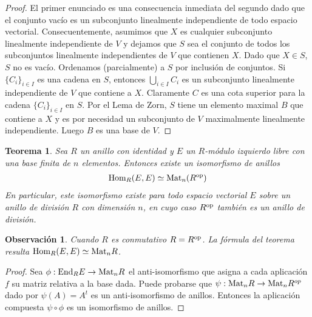\documentclass{report}
\newcommand{\Hom}{\textnormal{Hom}}
\newcommand{\End}{\textnormal{End}}
\newcommand{\Mat}{\textnormal{Mat}}
\newtheorem{theorem}{Teorema}
\newtheorem{remark}{Observación}
\begin{document}
  \begin{proof}
    El primer enunciado es una consecuencia inmediata del segundo dado que el conjunto vacío es un subconjunto linealmente independiente de todo espacio vectorial.
    Consecuentemente, asumimos que \(X\) es cualquier subconjunto linealmente independiente de \(V\) y dejamos que \(S\) sea el conjunto de todos los subconjuntos linealmente independientes de \(V\) que contienen \(X\).
    Dado que \(X \in S\), \(S\) no es vacío.
    Ordenamos (parcialmente) a \(S\) por inclusión de conjuntos.
    Si \(\{C_i\}_{i \in I}\) es una cadena en \(S\), entonces \(\bigcup_{i \in I} C_i\) es un subconjunto linealmente independiente de \(V\) que contiene a \(X\).
    Claramente \(C\) es una cota superior para la cadena \(\{C_i\}_{i \in I}\) en \(S\).
    Por el Lema de Zorn, \(S\) tiene un elemento maximal \(B\) que contiene a \(X\) y es por necesidad un subconjunto de \(V\) maximalmente linealmente independiente.
    Luego \(B\) es una base de \(V\).
  \end{proof}

  \begin{theorem}\label{theorem:isomorphismBetweenMatrixAndHomomorphismRings}
    Sea \(R\) un anillo con identidad y \(E\) un \(R\)-módulo izquierdo libre con una base finita de \(n\) elementos.
    Entonces existe un isomorfismo de anillos
    \begin{align}
      \Hom_R(E, E)
      \simeq
      \Mat_n(R^{\textnormal{op}})
    \end{align}
    En particular, este isomorfismo existe para todo espacio vectorial \(E\) sobre un anillo de división \(R\) con dimensión \(n\), en cuyo caso \(R^{\textnormal{op}}\) también es un anillo de división.
  \end{theorem}
  \begin{remark}
    Cuando \(R\) es conmutativo \(R = R^{\textnormal{op}}\).
    La fórmula del teorema resulta \(\Hom_R(E, E) \simeq \Mat_n R\).
  \end{remark}
  \begin{proof}
    Sea \(\phi: \End_R E \rightarrow \Mat_n R\) el anti-isomorfismo que asigna a cada aplicación \(f\) su matriz relativa a la base dada.
    Puede probarse que \(\psi : \Mat_n R \rightarrow \Mat_n R^{\mathnormal{op}}\) dado por \(\psi(A) = A^t\) es un anti-isomorfismo de anillos.
    Entonces la aplicación compuesta \(\psi \circ \phi\) es un isomorfismo de anillos.
  \end{proof}
\end{document}
